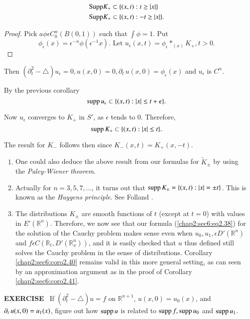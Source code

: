 \setcounter{coro}{40}
\begin{coro}\label{chap2:sec6:coro2.41}%
  \begin{align*}
    \operatorname{Supp} & K_+ \subset \{ (x, t) :  t \geq | x | \}\\
    \operatorname{Supp} & K_+ \subset \{ (x, t) : -t \geq | x | \}.
  \end{align*}\pageoriginale
\end{coro}

\begin{proof}
Pick $a \phi \epsilon C^{\alpha}_0 (B(0, 1))$ such that $\int \phi = 1$. Put 
$$
\phi_\epsilon (x) = \epsilon^{-n} \phi (\epsilon^{-1}
x). \text{ Let } u_\epsilon (x, t) = \phi_\epsilon *_{(x)} K_+,
t >0. 
$$
\end{proof}

Then $(\partial^2_t - \triangle ) u_\epsilon = 0, u (x, 0) = 0,
\partial_t\, u(x, 0) = \phi_\epsilon (x)$ and $u_\epsilon$ is
$C^\alpha$. 

By the previous corollary
$$
\operatorname{supp} u_\epsilon \subset \{ (x, t) : | x | \leq t + \epsilon \}.
$$


Now $u_\epsilon$ converges to $K_+$ in $S'$, as $\epsilon$ tends
to $0$. Therefore,  
$$
\operatorname{supp} K_+ \subset \{(x, t) : | x | \leq t \}.
$$


The result for $K_-$ follows then since $K_- (x, t) = K_+ (x, -t)$.

\setcounter{remarks}{41}
\begin{remarks}\label{chap2:sec6:rem2.42}%
\begin{enumerate}[\rm (i)]
\item One could also deduce the above result from our formulas for
  $\tilde{K}_{\pm}$ by using the {\em Paley-Wiener theorem}. 
\item Actually for $n = 3, 5, 7, \ldots $, it turns out that $\operatorname{supp}
  K_{\pm} = \{ (x, t) : | x | = \pm t \}$. This is known as the {\em
    Huygens principle}. See Folland \cite{1}. 
\item The distributions $K_\pm$ are smooth functions of $t$ (except at
  $t = 0$) with values in $E' (\mathbb{R}^n)$. Therefore, we now see
  that our formula (\ref{chap2:sec6:eq2.38}) for the solution of the
  Cauchy problem 
  makes sense even when $u_0, u_1, \epsilon D' (\mathbb{R}^n)$ and
  $f \epsilon C (\mathbb{R}_t, D' (\mathbb{R}^n_x))$, and it is\pageoriginale
  easily checked that $u$ thus defined still solves the Cauchy problem
  in the sense of distributions. Corollary \ref{chap2:sec6:coro2.40}
  remains valid in 
  this more general setting, as can seen by an approximation argument
  as in the proof of Corollary \ref{chap2:sec6:coro2.41}. 
\end{enumerate}
\end{remarks}

\textbf{EXERCISE}~ If $(\partial^2_t - \triangle ) u = f$ on
$\mathbb{R}^{n+1}$, $u (x, 0) = u_0 (x)$, and $\partial_t\, u (x, 0)\break = u_1
(x)$, figure out how $\operatorname{supp} u$ is related to $\operatorname{supp} f, \operatorname{supp} u_0$ and
$\operatorname{supp} u_1$. 
